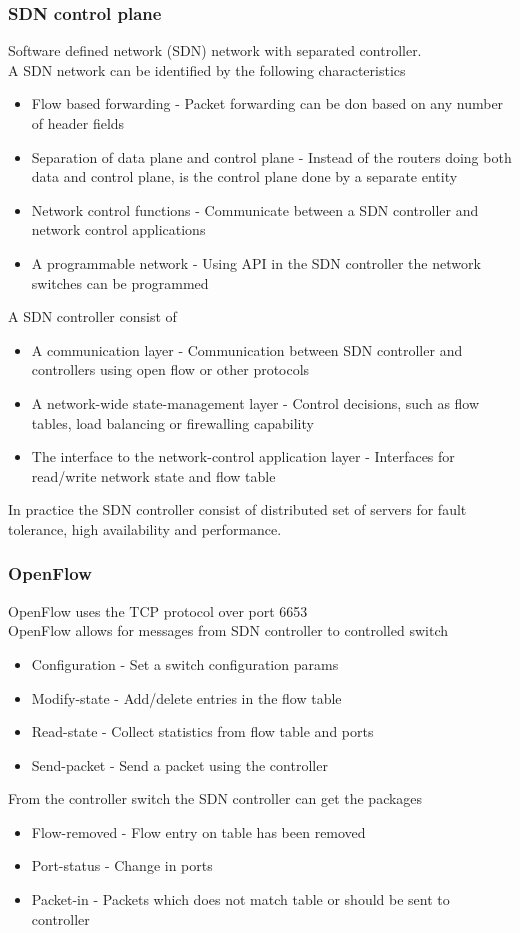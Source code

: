 \documentclass[12pt, a4paper]{article}
\begin{document}
			\subsubsection{SDN control plane}
				Software defined network (SDN) network with separated controller.\\
				A SDN network can be identified by the following characteristics
				\begin{itemize}
					\item Flow based forwarding - Packet forwarding can be don based on any number of header fields
					\item Separation of data plane and control plane - Instead of the routers doing both data and control plane, is the control plane done by a separate entity
					\item Network control functions - Communicate between a SDN controller and network control applications
					\item A programmable network - Using API in the SDN controller the network switches can be programmed
				\end{itemize}
				A SDN controller consist of 
				\begin{itemize}
					\item A communication layer - Communication between SDN controller and controllers using open flow or other protocols
					\item A network-wide state-management layer - Control decisions, such as flow tables, load balancing or firewalling capability
					\item The interface to the network-control application layer - Interfaces for read/write network state and flow table
				\end{itemize}
				In practice the SDN controller consist of distributed set of servers for fault tolerance, high availability and performance.
			\subsubsection{OpenFlow}
				OpenFlow uses the TCP protocol over port 6653\\
				OpenFlow allows for messages from SDN controller to controlled switch 
				\begin{itemize}
					\item Configuration - Set a switch configuration params
					\item Modify-state - Add/delete entries in the flow table
					\item Read-state - Collect statistics from flow table and ports
					\item Send-packet - Send a packet using the controller
				\end{itemize}
				From the controller switch the SDN controller can get the packages
				\begin{itemize}
					\item Flow-removed - Flow entry on table has been removed
					\item Port-status - Change in ports
					\item Packet-in - Packets which does not match table or should be sent to controller
				\end{itemize}
\end{document}
